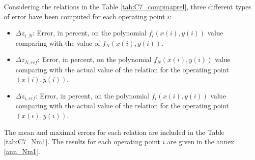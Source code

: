 Considering the relations in the Table \ref{tab:C7_compmaprel}, three different types of error have been computed for each operating point $i$:

\begin{itemize}
    \item $\Delta z_{i,N}$: Error, in percent, on the polynomial $f_i\left(x(i),y(i)\right)$ value comparing with the value of $f_N\left(x(i),y(i)\right)$.
    \item $\Delta z_{N,ref}$: Error, in percent, on the polynomial $f_N\left(x(i),y(i)\right)$ value comparing with the actual value of the relation for the operating point $\left(x(i),y(i)\right)$.
    \item $\Delta z_{i,ref}$: Error, in percent, on the polynomial $f_i\left(x(i),y(i)\right)$ value comparing with the actual value of the relation for the operating point $\left(x(i),y(i)\right)$.
\end{itemize}

The mean and maximal errors for each relation are included in the Table \ref{tab:C7_Nm1}. The results for each operating point $i$ are given in the annex \ref{ann_Nm1}.


